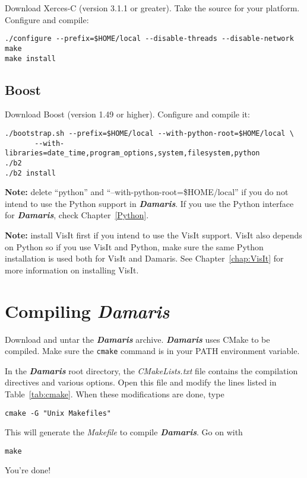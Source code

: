 \documentclass[11pt]{report}
\newcommand{\Damaris}{\emph{\textbf{Damaris}}}
\newcommand{\file}[1]{\emph{#1}}
\begin{document}
Download Xerces-C (version 3.1.1 or greater). Take the source for your platform.
Configure and compile:

\begin{verbatim}
./configure --prefix=$HOME/local --disable-threads --disable-network
make
make install
\end{verbatim}

\subsection{Boost}

Download Boost (version 1.49 or higher). Configure and compile it:

\begin{verbatim}
./bootstrap.sh --prefix=$HOME/local --with-python-root=$HOME/local \
       --with-libraries=date_time,program_options,system,filesystem,python 
./b2
./b2 install
\end{verbatim}

\noindent\textbf{Note:} delete ``python'' and ``--with-python-root=\$HOME/local'' if you do not intend 
to use the Python support in \Damaris{}. If you use the Python interface for \Damaris{}, check
Chapter~\ref{Python}.\newline

\noindent\textbf{Note:} install VisIt first if you intend to use the VisIt support. VisIt also depends on Python
so if you use VisIt and Python, make sure the same Python installation is used both for
VisIt and Damaris. See Chapter~\ref{chap:VisIt} for more information on installing VisIt.

\section{Compiling \Damaris{}}

Download and untar the \Damaris{} archive. \Damaris{} uses CMake to be compiled.
Make sure the \texttt{cmake} command is in your PATH environment variable.

In the \Damaris{} root directory, the \file{CMakeLists.txt} file contains the compilation directives
and various options. Open this file and modify the lines listed in Table~\ref{tab:cmake}.
When these modifications are done, type
\begin{verbatim}
cmake -G "Unix Makefiles"
\end{verbatim}
This will generate the \file{Makefile} to compile \Damaris{}. Go on with 
\begin{verbatim}
make
\end{verbatim}
You're done!
\end{document}
